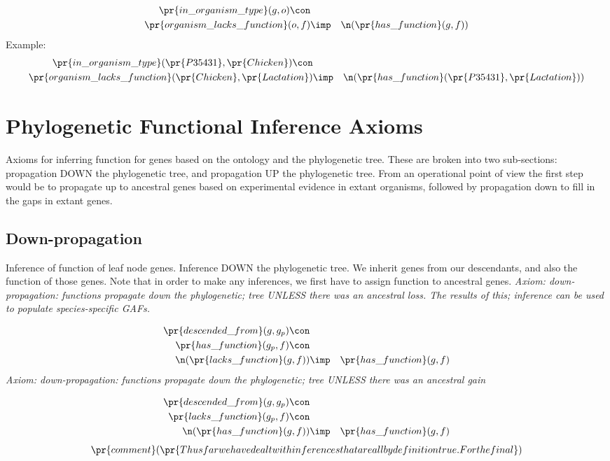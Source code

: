\begin{eqnarray*}
 \pr{in\_organism\_type}(g, o) \con \\
 \pr{organism\_lacks\_function}(o, f) &\imp & \n( \pr{has\_function}(g, f) )
\end{eqnarray*}
Example: \begin{eqnarray*}
 \pr{in\_organism\_type}( \pr{P35431},  \pr{Chicken}) \con \\
 \pr{organism\_lacks\_function}( \pr{Chicken},  \pr{Lactation}) &\imp & \n( \pr{has\_function}( \pr{P35431},  \pr{Lactation}) )
\end{eqnarray*}
\section{Phylogenetic Functional Inference Axioms}
Axioms for
inferring function for genes based on the ontology and the
phylogenetic tree. These are broken into two sub-sections: propagation
DOWN the phylogenetic tree, and propagation UP the phylogenetic
tree. From an operational point of view the first step would be to
propagate up to ancestral genes based on experimental evidence in
extant organisms, followed by propagation down to fill in the gaps in
extant genes.
\subsection{Down-propagation}
Inference of function of leaf node
genes. Inference DOWN the phylogenetic tree. We inherit genes from our
descendants, and also the function of those genes. Note that in order
to make any inferences, we first have to assign function to ancestral
genes.
\emph{Axiom: down-propagation: functions propagate down the phylogenetic; tree UNLESS there was an ancestral loss.  The results of this; inference can be used to populate species-specific GAFs. }

\begin{eqnarray*}
 \pr{descended\_from}(g, g_p) \con \\
 \pr{has\_function}(g_p, f) \con \\
 \n( \pr{lacks\_function}(g, f) )&\imp & \pr{has\_function}(g, f) 
\end{eqnarray*}
\emph{Axiom: down-propagation: functions propagate down the phylogenetic; tree UNLESS there was an ancestral gain}

\begin{eqnarray*}
 \pr{descended\_from}(g, g_p) \con \\
 \pr{lacks\_function}(g_p, f) \con \\
 \n( \pr{has\_function}(g, f) )&\imp & \pr{has\_function}(g, f) 
\end{eqnarray*}
\begin{eqnarray*}
 \pr{comment}( \pr{Thus far we have dealt with inferences that are all by
definition true. For the final }) 
\end{eqnarray*}
